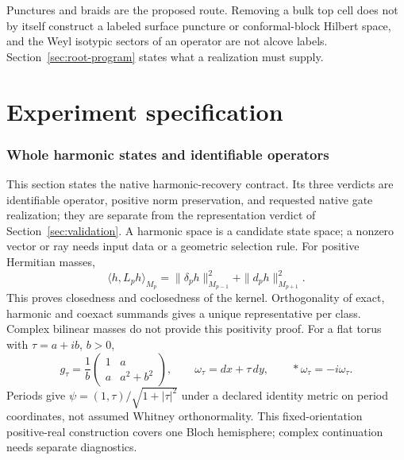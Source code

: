 \documentclass[11pt]{article}
\theoremstyle{definition}
\theoremstyle{remark}
\begin{document}
Punctures and braids are the proposed route. Removing a bulk top cell does
not by itself construct a labeled surface puncture or conformal-block
Hilbert space, and the Weyl isotypic sectors of an operator are not alcove
labels. Section~\ref{sec:root-program} states what a realization must supply.

\clearpage
\part{Experiment specification}

\section{Whole harmonic states and identifiable operators}\label{sec:kernel-contract}

This section states the native harmonic-recovery contract. Its three
verdicts are identifiable operator, positive norm preservation, and
requested native gate realization; they are separate from the
representation verdict of Section~\ref{sec:validation}.
A harmonic space is a candidate state space; a nonzero vector or ray needs
input data or a geometric selection rule. For positive Hermitian masses,
\[
 \langle h,L_ph\rangle_{M_p}
 =\|\delta_ph\|_{M_{p-1}}^2+\|d_ph\|_{M_{p+1}}^2.
\]
This proves closedness and coclosedness of the kernel. Orthogonality of
exact, harmonic and coexact summands gives a unique representative per
class. Complex bilinear masses do not provide this positivity proof.
For a flat torus with $\tau=a+ib$, $b>0$,
\[
 g_\tau=\frac1b\begin{pmatrix}1&a\\a&a^2+b^2\end{pmatrix},\qquad
 \omega_\tau=dx+\tau\,dy,\qquad *\omega_\tau=-i\omega_\tau .
\]
Periods give $\psi=(1,\tau)/\sqrt{1+|\tau|^2}$ under a declared identity
metric on period coordinates, not assumed Whitney orthonormality.
This fixed-orientation positive-real construction covers one Bloch
hemisphere; complex continuation needs separate diagnostics.
\end{document}
